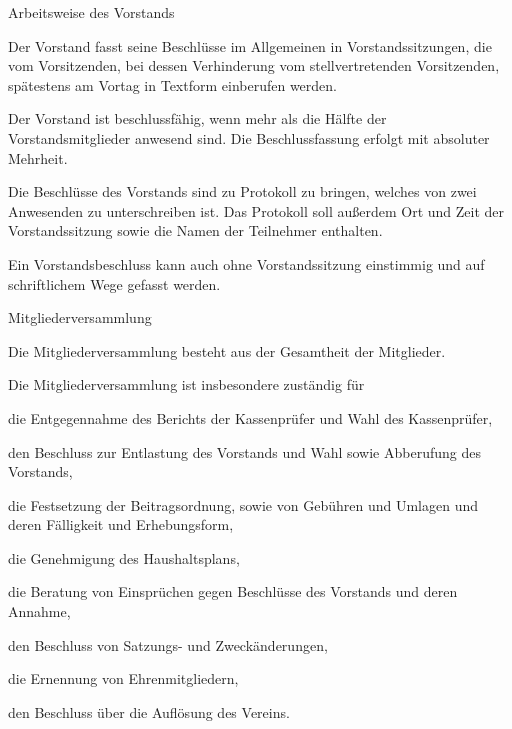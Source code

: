 \documentclass[11pt,a4paper,twoside,openany,article]{memoir}
\begin{document}
\begin{para}{Arbeitsweise des Vorstands}
	\label{p:vsarbeitsweise}
	\item Der Vorstand fasst seine Beschlüsse im Allgemeinen in Vorstandssitzungen, die vom Vorsitzenden, bei dessen Verhinderung vom stellvertretenden Vorsitzenden, spätestens am Vortag in Textform einberufen werden.
	\item Der Vorstand ist beschlussfähig, wenn mehr als die Hälfte der Vorstandsmitglieder anwesend sind. Die Beschlussfassung erfolgt mit absoluter Mehrheit.
	\item Die Beschlüsse des Vorstands sind zu Protokoll zu bringen, welches von zwei Anwesenden zu unterschreiben ist. Das Protokoll soll außerdem Ort und Zeit der Vorstandssitzung sowie die Namen der Teilnehmer enthalten.
	\item Ein Vorstandsbeschluss kann auch ohne Vorstandssitzung einstimmig und auf schriftlichem Wege gefasst werden.
\end{para}

\begin{para}{Mitgliederversammlung}
	\label{p:mv}
	\item Die Mitgliederversammlung besteht aus der Gesamtheit der Mitglieder.
	\item Die Mitgliederversammlung ist insbesondere zuständig für
	\begin{subpara}
		\item die Entgegennahme des Berichts der Kassenprüfer und Wahl des Kassenprüfer,
		\item den Beschluss zur Entlastung des Vorstands und Wahl sowie Abberufung des Vorstands,
		\item die Festsetzung der Beitragsordnung, sowie von Gebühren und Umlagen und deren Fälligkeit und Erhebungsform,
		\item die Genehmigung des Haushaltsplans,
		\item die Beratung von Einsprüchen gegen Beschlüsse des Vorstands und deren Annahme,
		\item den Beschluss von Satzungs- und Zweckänderungen,
		\item die Ernennung von Ehrenmitgliedern,
		\item den Beschluss über die Auflösung des Vereins.
	\end{subpara}
\end{para}
\end{document}
